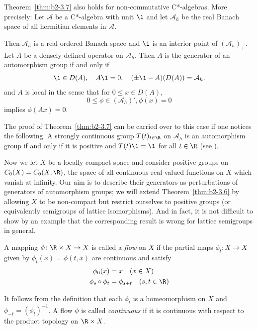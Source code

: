 \begin{remark*}\label{rem:b2-3.7b}
Theorem~\ref{thm:b2-3.7} also holds for non-com\-mutative C*-algebras.
More precisely: Let $\mathcal{A}$ be a C*-algebra with unit $\1$ and let $\mathcal{A}_{h}$ be the real Banach space of all hermitian elements in $\mathcal{A}$.

Then $\mathcal{A}_{h}$ is a real ordered Banach space and $\1$ is an interior point of\/ $(\mathcal{A}_{h})_{+}$.
Let $A$ be a densely defined operator on $\mathcal{A}_{h}$.
Then $A$ is the generator of an automorphism group if and only if\/ 
\[
    \1 \in D(A), \quad A\1 = 0, \quad
    (\pm\1 - A)(D(A)) = \mathcal{A}_{h}.
\]
and $A$ is local in the sense that for $0 \leq x \in D(A)$,
%
\[
	0 \leq \phi \in (\mathcal{A}_{h})', \phi(x) = 0
\]
%
implies $\phi(Ax) = 0$.

The proof of Theorem~\ref{thm:b2-3.7} can be carried over to this case if one notices the following.
A strongly continuous group $T(t)_{t \in \R}$ on $\mathcal{A}_{h}$ is an automorphism group if and only if it is positive and $T(t)\1 = \1$ for all $t \in \R$ (see \textcite[Corollary 3.2.21]{brattelirobinson:1979}).
\end{remark*}
Now we let $X$ be a locally compact space and consider positive groups on $C_{0}(X) = C_{0}(X,\R)$, the space of all continuous real-valued functions on $X$ which vanish at infinity.
Our aim is to describe their generators as perturbations of generators of automorphism groups; \ie  we will extend Theorem~\ref{thm:b2-3.6} by allowing $X$ to be non-compact but
restrict ourselves to positive groups (or equivalently semigroups of lattice isomorphisms).
And in fact, it is not difficult to show by an example that the corresponding result is wrong for lattice semigroups in general.

A mapping $\phi \colon \R \times X \to X$ is called a \emph{flow} on $X$ if the partial maps $\phi_{t} \colon X \to X$ given by $\phi_{t}(x) = \phi(t,x)$ are continuous and satisfy
\begin{align}
\phi_{0}(x) &= x \quad (x \in X) \label{eq:b2-3.8} \\
\phi_{s} \circ \phi_{t} &= \phi_{s+t} \quad (s,t \in \R) \label{eq:b2-3.9}
\end{align}

It follows from the definition that each $\phi_{t}$ is a homeomorphism on $X$ and 
$\phi_{-t}=(\phi_{t})^{-1}$. 
A flow $\phi$ is called \emph{continuous} if it is continuous with respect to the product topology on $\R \times X$.

